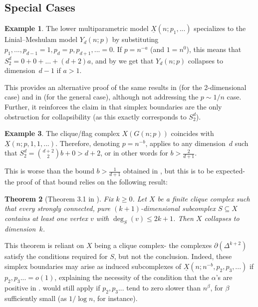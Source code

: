 \documentclass{article}
\theoremstyle{plain}
\newtheorem{theorem}{Theorem}[section]
\theoremstyle{definition}
\newtheorem{example}[theorem]{Example}
\theoremstyle{remark}
\newcommand{\di}{dimension}
\begin{document}
\subsection{Special Cases}
\begin{example}\label{exm:lower}
    The lower multiparametric model $\underline{X}(n;p_1,...)$ specializes to the Linial–Meshulam model $Y_d(n;p)$ by substituting $p_1,...,p_{d-1}=1, p_d=p, p_{d+1},...=0$.
    If $p=n^{-a}$ (and $1=n^0$), this means that $S_2^d=0+0+...+(d+2)a$, and by  we get that $Y_d(n;p)$ collapses to \di\ $d-1$ if $a>1$.

    This provides an alternative proof of the same results in \cite{CCFK12} (for the 2-\di al case) and in \cite{AronshtamLinialLM13} (for the general case), although not addressing the $p\sim 1/n$ case.
    Further, it reinforces the claim in \cite{AronshtamLinialLM13} that simplex boundaries are the only obstruction for collapsibility (as this exactly corresponds to $S_2^d$).
\end{example}
\begin{example}\label{ex:clique}
    The clique/flag complex $X(G(n;p))$ coincides with $\underline{X}(n;p,1,1,...)$. Therefore, denoting $p=n^{-b}$,  applies to any \di\ $d$ such that $S_2^d=\binom{d+2}{2}b+0>d+2$, or in other words for $b>\frac{2}{d+1}$.
    
    This is worse than the bound $b>\frac{1}{d+1}$ obtained in \cite{MALEN23}, but this is to be expected- the proof of that bound relies on the following result:
    \begin{theorem}[Theorem 3.1 in \cite{MALEN23}]
Fix $k \ge 0$. Let $X$ be a finite clique complex such that every strongly connected, pure $(k+1)$-dimensional subcomplex $S \subseteq X$ contains at least one vertex $v$ with $\deg_S(v) \le 2k + 1$.
Then $X$ collapses to \di\ $k$.
\end{theorem}
This theorem is reliant on $X$ being a clique complex- the complexes $\partial(\Delta^{k+2})$ satisfy the conditions required for $S$, but not the conclusion.  
Indeed, these simplex boundaries may arise as induced subcomplexes of $\underline{X}(n;n^{-b},p_2,p_3,...)$ if $p_2,p_3...=o(1)$, explaining the necessity of the condition that the $\alpha$'s are positive in .
 would still apply if $p_2,p_3...$ tend to zero slower than $n^{\beta}$, for $\beta$ sufficiently small (as $1/\log n$, for instance).
\end{example}
\end{document}
